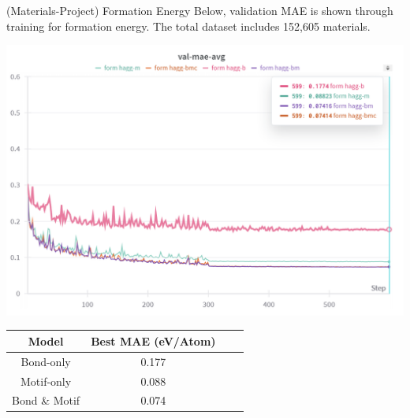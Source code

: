 \documentclass[11pt]{beamer}
\begin{document}
\begin{frame}{(Materials-Project) Formation Energy}\small
Below, validation MAE is shown through training for formation energy. The total dataset includes 152,605 materials.
\begin{center}

\includegraphics[scale=0.4]{formation_energy.png}

\medskip

\medskip


\begin{tabular}{c|ccc}
Model & Best MAE (eV/Atom) \\
\hline
Bond-only & 0.177 \\
Motif-only &  0.088\\
Bond \& Motif &  0.074\\
\end{tabular}
\end{center}
\end{frame}
\end{document}
